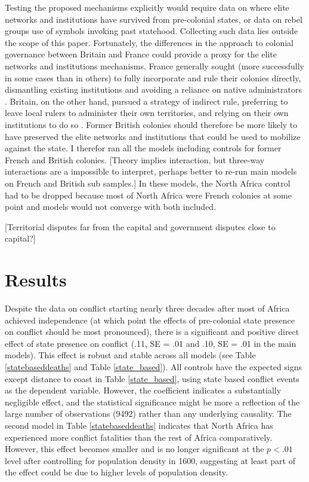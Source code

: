\documentclass[12pt]{article}
\begin{document}
Testing the proposed mechanisms explicitly would require data on where elite
networks and institutions have survived from pre-colonial states, or data on
rebel groups use of symbols invoking past statehood. Collecting such data lies
outside the scope of this paper. Fortunately, the differences in the approach to
colonial governance between Britain and France could provide a proxy for the
elite networks and institutions mechanisms. France generally sought (more
successfully in some cases than in others) to fully incorporate and rule their
colonies directly, dismantling existing institutions and avoiding a reliance on
native administrators \citep{Blanton_2001}. Britain, on the other hand, pursued
a strategy of indirect rule, preferring to leave local rulers to administer
their own territories, and relying on their own institutions to do so
\citep{Blanton_2001}. Former British colonies should therefore be more likely to
have preserved the elite networks and institutions that could be used to
mobilize against the state. I therefor ran all the models including controls for
former French and British colonies. [Theory implies interaction, but three-way
interactions are a impossible to interpret, perhaps better to re-run main models
on French and British sub samples.] In these models, the North Africa control had
to be dropped because most of North Africa were French colonies at some point
and models would not converge with both included. 

[Territorial disputes far from the capital and government disputes close to
capital?]

\section{Results} \label{Results}

Despite the data on conflict starting nearly three decades after most of Africa
achieved independence (at which point the effects of pre-colonial state presence
on conflict should be most pronounced), there is a significant
and positive direct effect of state presence on conflict (.11, SE = .01 and .10,
SE = .01 in the main models). This effect is robust and stable across all models
(see Table \ref{statebaseddeaths} and Table \ref{state_based}). All controls
have the expected signs except distance to coast in Table \ref{state_based},
using state based conflict events as the dependent variable. However, the
coefficient indicates a substantially negligible effect, and the statistical
significance might be more a reflection of the large number of observations
(9492) rather than any underlying causality. The second model in Table
\ref{statebaseddeaths} indicates that North Africa has experienced more conflict
fatalities than the rest of Africa comparatively. However, this effect becomes
smaller and is no longer significant at the $ p < .01 $ level after controlling
for population density in 1600, suggesting at least part of the effect could be
due to higher levels of population density.
\end{document}

